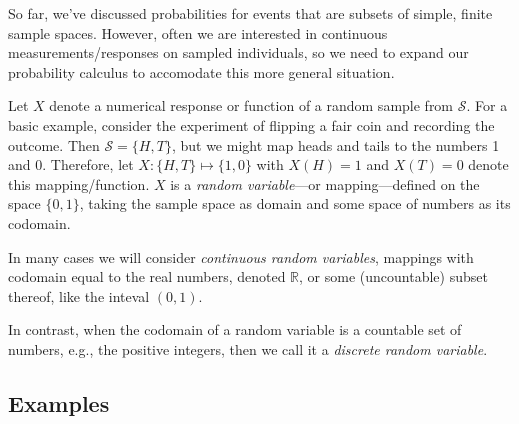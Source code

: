 \documentclass[]{book}
\begin{document}
So far, we've discussed probabilities for events that are subsets of
simple, finite sample spaces. However, often we are interested in
continuous measurements/responses on sampled individuals, so we need to
expand our probability calculus to accomodate this more general
situation.

Let \(X\) denote a numerical response or function of a random sample
from \(\mathcal{S}\). For a basic example, consider the experiment of
flipping a fair coin and recording the outcome. Then
\(\mathcal{S} = \{H, T\}\), but we might map heads and tails to the
numbers 1 and 0. Therefore, let \(X:\{H,T\}\mapsto \{1,0\}\) with
\(X(H) = 1\) and \(X(T) = 0\) denote this mapping/function. \(X\) is a
\emph{random variable}---or mapping---defined on the space \(\{0,1\}\),
taking the sample space as domain and some space of numbers as its
codomain.

In many cases we will consider \emph{continuous random variables},
mappings with codomain equal to the real numbers, denoted
\(\mathbb{R}\), or some (uncountable) subset thereof, like the inteval
\((0,1)\).

In contrast, when the codomain of a random variable is a countable set
of numbers, e.g., the positive integers, then we call it a
\emph{discrete random variable}.

\subsection{Examples}\label{examples}
\end{document}
